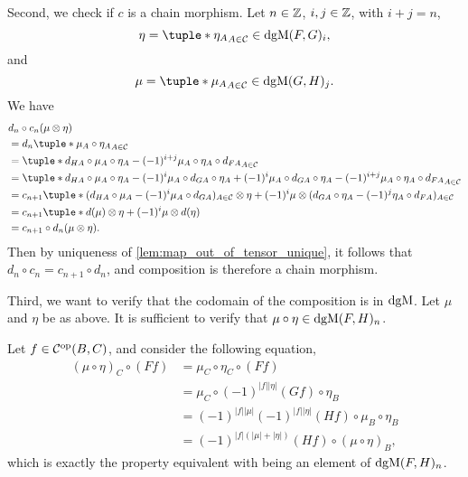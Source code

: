 \begin{remark}
    Second, we check if \( c \) is a chain morphism. Let \( n \in {\mathbb{Z}} \), \( i, j \in {\mathbb{Z}} \), with \( i + j = n \),
    \[
        \eta = \tuple*{\eta_A}_{A \in \Cc} \in \dgM(F, G)_i,
    \]
    and
    \[
        \mu = \tuple*{\mu_A}_{A \in \Cc} \in \dgM(G, H)_j.
    \]
    We have
    \begin{align*}
        &d_n \circ c_n (\mu \otimes \eta) \\
        &= d_n \tuple*{\mu_A \circ \eta_A}_{A \in \Cc} \\
        &= \tuple*{d_{H A} \circ \mu_A \circ \eta_A - (-1)^{i + j} \mu_A \circ \eta_A \circ d_{F A}}_{A \in \Cc} \\
        &= \tuple*{d_{H A} \circ \mu_A \circ \eta_A - (-1)^i \mu_A \circ d_{G A} \circ \eta_A + (-1)^i \mu_A \circ d_{G A} \circ \eta_A - (-1)^{i + j} \mu_A \circ \eta_A \circ d_{F A}}_{A \in \Cc} \\
        &= c_{n + 1} \tuple*{ (d_{H A} \circ \mu_A - (-1)^i \mu_A \circ d_{G A})_{A \in \Cc} \otimes \eta + (-1)^i \mu \otimes (d_{G A} \circ \eta_A - (-1)^j \eta_A \circ d_{F A})_{A \in \Cc} } \\
        &= c_{n + 1} \tuple*{ d(\mu) \otimes \eta + (-1)^i \mu \otimes d(\eta) } \\
        &= c_{n + 1} \circ d_n (\mu \otimes \eta).
    \end{align*}
    Then by uniqueness of \autoref{lem:map_out_of_tensor_unique}, it follows that \( d_n \circ c_n = c_{n + 1} \circ d_n \), and composition is therefore a chain morphism.
    
    Third, we want to verify that the codomain of the composition is in \( \operatorname{dgM} \). Let \( \mu \) and \( \eta \) be as above. It is sufficient to verify that \( \mu \circ \eta \in \operatorname{dgM}(F, H)_n \).

    Let \( f \in {\mathcal{C}}^{\operatorname{op}}(B, C) \), and consider the following equation,
    \begin{align*}
        (\mu \circ \eta)_C \circ (F f) &= \mu_C \circ \eta_C \circ (F f) \\
        &= \mu_C \circ (-1)^{|f||\eta|} (G f) \circ \eta_B \\
        &= (-1)^{|f||\mu|}(-1)^{|f||\eta|} (H f) \circ \mu_B \circ \eta_B \\
        &= (-1)^{|f|(|\mu| + |\eta|)} (H f) \circ (\mu \circ \eta)_B,
    \end{align*}
    which is exactly the property equivalent with being an element of \( \operatorname{dgM}(F, H)_n \).


\end{remark}
